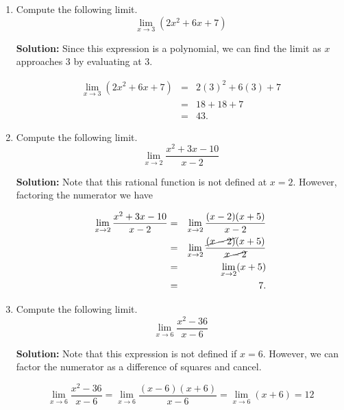 \documentclass{article}
\begin{document}
\ActivityTitle[class=Calculus I, number=1, name=Limits (Solutions)]

\begin{enumerate}
\item Compute the following limit. \[ \lim_{x \rightarrow 3} \left( 2 x^2 + 6 x + 7 \right) \]

\textbf{Solution:} Since this expression is a polynomial, we can find the limit as $x$ approaches 3 by evaluating at 3.

\begin{eqnarray*}
\lim_{x \rightarrow 3} \left( 2 x^2 + 6 x + 7 \right)
 & = & 2 (3)^2 + 6 (3) + 7 \\
 & = & 18 + 18 + 7 \\
 & = & 43.
\end{eqnarray*}


  
\vspace{1cm}

\item Compute the following limit. \[ \displaystyle\lim_{x \rightarrow 2} \frac{x^2 + 3x - 10}{x - 2} \]

\textbf{Solution:} Note that this rational function is not defined at $x = 2$. However, factoring the numerator we have 

\begin{eqnarray*}
\lim_{x \rightarrow 2} \frac{x^2 + 3x - 10}{x - 2}
 & = & \lim_{x \rightarrow 2} \frac{(x - 2)(x + 5)}{x - 2} \\
 & = & \lim_{x \rightarrow 2} \frac{\cancel{(x - 2)}(x + 5)}{\cancel{x - 2}} \\
 & = & \lim_{x \rightarrow 2} (x + 5) \\
 & = & 7. \\
\end{eqnarray*}


  
\vspace{1cm}

\item Compute the following limit. \[ \lim_{x \rightarrow 6} \frac{x^2 - 36}{x - 6} \]

\textbf{Solution:} Note that this expression is not defined if $x = 6$. However, we can factor the numerator as a difference of squares and cancel.

\[ \lim_{x \rightarrow 6} \frac{x^2 - 36}{x - 6} = \lim_{x \rightarrow 6} \frac{(x - 6)(x + 6)}{x - 6} = \lim_{x \rightarrow 6} (x + 6) = 12 \]



\end{enumerate}
\end{document}
